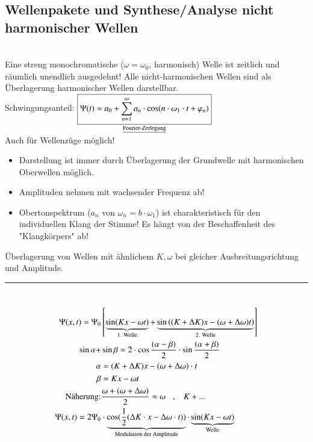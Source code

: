 \subsection{Wellenpakete und Synthese/Analyse nicht harmonischer Wellen} \hfill \\
Eine streng monochromatische ($ \omega=\omega_0 $, harmonisch) Welle ist zeitlich und räumlich unendlich ausgedehnt! Alle nicht-harmonischen Wellen sind als Überlagerung harmonischer Wellen darstellbar. \\
Schwingungsanteil: $ \underset{\text{\underline{Fourier-Zerlegung}}}{\boxed{\Psi(t) = a_0 + \sum_{n=1}^{\infty} a_n \cdot \cos(n\cdot\omega_1\cdot t + \varphi_n)}} $ \\
Auch für Wellenzüge möglich!
\bild
\bild
\bild
\begin{itemize}
	\item Darstellung ist immer durch Überlagerung der Grundwelle mit harmonischen Oberwellen möglich.
	\item Amplituden nehmen mit wachsender Frequenz ab!
	\item Obertonspektrum ($ a_n $ von $ \omega_n = b\cdot \omega_1 $) ist charakteristisch für den individuellen Klang der Stimme! Es hängt von der Beschaffenheit des "Klangkörpers" ab!
\end{itemize}
Überlagerung von Wellen mit ähnlichem $ K,\omega $ bei gleicher Ausbreitungsrichtung und Amplitude.\\
\rule{5cm}{.2pt}\\
\bild
\begin{align*}
\Psi(x,t) = \Psi_0 &\left[ \underbrace{\sin(Kx-\omega t) }_{\text{1. Welle}}+ \underbrace{\sin\left( (K+\Delta K)x-(\omega+\Delta\omega)t\right) }_{\text{2. Welle}} \right]\\
\sin\alpha+&\sin\beta = 2\cdot\cos\frac{(\alpha-\beta)}{2} \cdot \sin\frac{(\alpha+\beta)}{2}\\
\alpha &=(K+\Delta K)x-(\omega+\Delta\omega) \cdot t\\
\beta &= Kx-\omega t\\
\text{Näherung:}& \frac{\omega + (\omega + \Delta\omega)}{2} \approx \omega \hspace{3mm} ,\hspace{3mm} K+...\\
\Psi(x,t) = 2 \Psi_0 & \cdot \underbrace{\cos(\frac{1}{2}(\Delta K \cdot x - \Delta\omega\cdot t) )}_{\text{Modulation der Amplitude}} \cdot \underbrace{\sin(Kx-\omega t)}_{\text{Welle}}
\end{align*}
\bild
